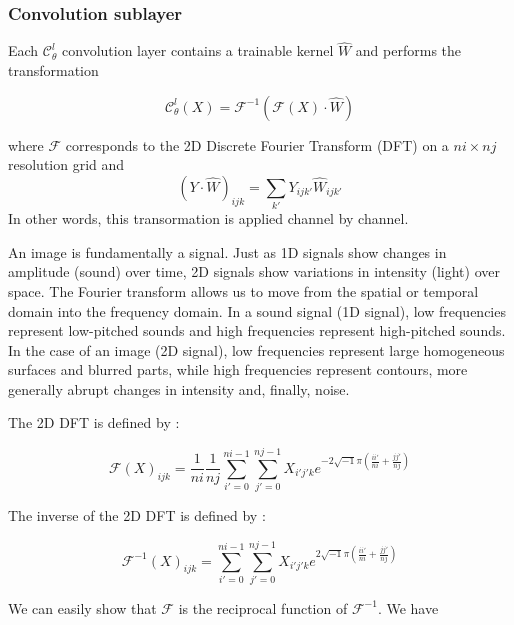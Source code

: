 \subsubsection{Convolution sublayer} \label{FNO.conv_sublayer}

Each $\mathcal{C}_\theta^l$ convolution layer contains a trainable kernel $\hat{W}$ and performs the transformation

\begin{equation*}
	\mathcal{C}_\theta^l(X)=\mathcal{F}^{-1}(\mathcal{F}(X)\cdot\hat{W})
\end{equation*}

where $\mathcal{F}$ corresponds to the 2D Discrete Fourier Transform (DFT) on a $ni\times nj$ resolution grid and
\begin{equation*}
	(Y\cdot\hat{W})_{ijk}=\sum_{k'}Y_{ijk'}\hat{W}_{ijk'}
\end{equation*}
In other words, this transormation is applied channel by channel.

\begin{Rem}
	An image is fundamentally a signal. Just as 1D signals show changes in amplitude (sound) over time, 2D signals show variations in intensity (light) over space. The Fourier transform allows us to move from the spatial or temporal domain into the frequency domain. In a sound signal (1D signal), low frequencies represent low-pitched sounds and high frequencies represent high-pitched sounds. In the case of an image (2D signal), low frequencies represent large homogeneous surfaces and blurred parts, while high frequencies represent contours, more generally abrupt changes in intensity and, finally, noise.
\end{Rem}

The 2D DFT is defined by :

\begin{equation*}
\mathcal{F}(X)_{ijk}=\frac{1}{ni}\frac{1}{nj}\sum_{i'=0}^{ni-1}\sum_{j'=0}^{nj-1}X_{i'j'k}e^{-2\sqrt{-1}\pi\left(\frac{ii'}{ni}+\frac{jj'}{nj}\right)}
\end{equation*}

The inverse of the 2D DFT is defined by :

\begin{equation*}
\mathcal{F}^{-1}(X)_{ijk}=\sum_{i'=0}^{ni-1}\sum_{j'=0}^{nj-1}X_{i'j'k}e^{2\sqrt{-1}\pi\left(\frac{ii'}{ni}+\frac{jj'}{nj}\right)}
\end{equation*}

We can easily show that $\mathcal{F}$ is the reciprocal function of $\mathcal{F}^{-1}$. We have 

